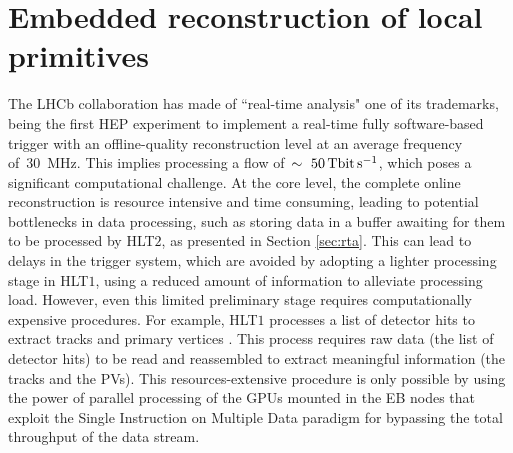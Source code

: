
\chapter{Embedded reconstruction of local primitives}
\label{chp:retina}

The LHCb collaboration has made of ``real-time analysis" one of its trademarks, being the first HEP experiment to implement a real-time fully software-based trigger with an offline-quality reconstruction level at an average frequency of~\SI{30}{\mega\hertz}. This implies processing a flow of~$\sim~\SI{50}{\tera\bit\per\second}$, which poses a significant computational challenge.
At the core level, the complete online reconstruction is resource intensive and time consuming, leading to potential bottlenecks in data processing, such as storing data in a buffer awaiting for them to be processed by HLT$2$, as presented in Section \ref{sec:rta}. This can lead to delays in the trigger system, which are avoided by adopting a lighter processing stage in HLT$1$, using a reduced amount of information to alleviate processing load.
However, even this limited preliminary stage requires computationally expensive procedures. For example, HLT$1$ processes a list of detector hits to extract tracks and primary vertices \cite{https://doi.org/10.5281/zenodo.8119731}. This process requires raw data (the list of detector hits) to be read and reassembled to extract meaningful information (the tracks and the PVs). This resources-extensive procedure is only possible by using the power of parallel processing of the GPUs mounted in the EB nodes that exploit the Single Instruction on Multiple Data paradigm\cite{5009071} for bypassing the total throughput of the data stream.

